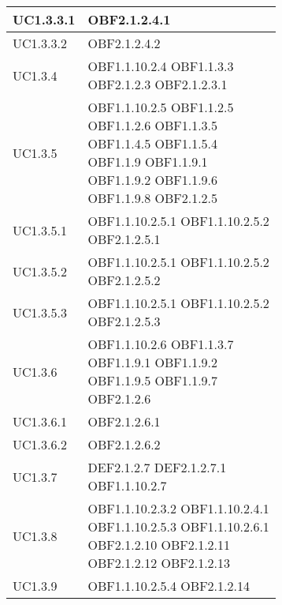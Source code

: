 \documentclass{scalatekids-article}
\begin{document}
\begin{longtable}[H]{|p{5.5cm}|p{5.5cm}|}
  \hline
  UC1.3.3.1 & \multiLineCell[t]{OBF2.1.2.4.1\\}\\
  \hline
  UC1.3.3.2 & \multiLineCell[t]{OBF2.1.2.4.2\\}\\
  \hline
  UC1.3.4 & \multiLineCell[t]{OBF1.1.10.2.4 OBF1.1.3.3\\OBF2.1.2.3 OBF2.1.2.3.1\\}\\
  \hline
  UC1.3.5 & \multiLineCell[t]{OBF1.1.10.2.5 OBF1.1.2.5\\OBF1.1.2.6 OBF1.1.3.5\\OBF1.1.4.5 OBF1.1.5.4\\OBF1.1.9 OBF1.1.9.1\\OBF1.1.9.2 OBF1.1.9.6\\OBF1.1.9.8 OBF2.1.2.5\\}\\
  \hline
  UC1.3.5.1 & \multiLineCell[t]{OBF1.1.10.2.5.1 OBF1.1.10.2.5.2\\OBF2.1.2.5.1}\\
  \hline
  UC1.3.5.2 & \multiLineCell[t]{OBF1.1.10.2.5.1 OBF1.1.10.2.5.2\\OBF2.1.2.5.2}\\
  \hline
  UC1.3.5.3 & \multiLineCell[t]{OBF1.1.10.2.5.1 OBF1.1.10.2.5.2\\OBF2.1.2.5.3}\\
  \hline
  UC1.3.6 & \multiLineCell[t]{OBF1.1.10.2.6 OBF1.1.3.7\\OBF1.1.9.1 OBF1.1.9.2\\OBF1.1.9.5 OBF1.1.9.7\\OBF2.1.2.6}\\
  \hline
  UC1.3.6.1 & \multiLineCell[t]{OBF2.1.2.6.1\\}\\
  \hline
  UC1.3.6.2 & \multiLineCell[t]{OBF2.1.2.6.2\\}\\
  \hline
  UC1.3.7 & \multiLineCell[t]{DEF2.1.2.7 DEF2.1.2.7.1\\OBF1.1.10.2.7}\\
  \hline
  UC1.3.8 & \multiLineCell[t]{OBF1.1.10.2.3.2 OBF1.1.10.2.4.1\\OBF1.1.10.2.5.3 OBF1.1.10.2.6.1\\OBF2.1.2.10 OBF2.1.2.11\\OBF2.1.2.12 OBF2.1.2.13\\}\\
  \hline
  UC1.3.9 & \multiLineCell[t]{OBF1.1.10.2.5.4 OBF2.1.2.14\\}\\

\end{longtable}
\end{document}
